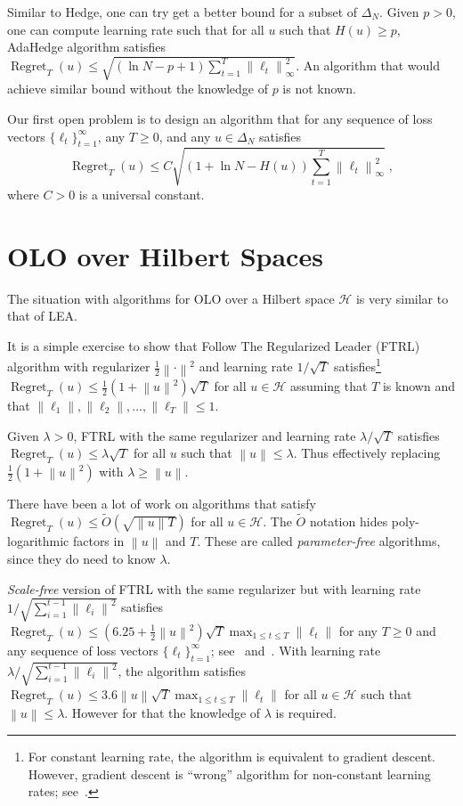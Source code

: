 \documentclass{colt2016} %
\DeclareMathOperator{\Regret}{Regret}
\renewcommand{\H}{\mathcal{H}}  %
\newcommand{\norm}[1]{\left\|{#1}\right\|}
\begin{document}
Similar to Hedge, one can try get a better bound for a subset of $\Delta_N$.
Given $p > 0$, one can compute learning rate such that for all $u$ such that
$H(u) \ge p$, AdaHedge algorithm satisfies $\Regret_T(u) \le \sqrt{(\ln N - p +
1) \sum_{t=1}^T \norm{\ell_t}_\infty^2}$. An algorithm that would achieve
similar bound without the knowledge of $p$ is not known.

Our first open problem is to design an algorithm that for any
sequence of loss vectors $\{\ell_t\}_{t=1}^\infty$, any $T \ge 0$,
and any $u \in \Delta_N$ satisfies
$$
\Regret_T(u) \le C \sqrt{(1 + \ln N - H(u)) \sum_{t=1}^T \norm{\ell_t}_\infty^2} \; ,
$$
where $C > 0$ is a universal constant.

\section{OLO over Hilbert Spaces}

The situation with algorithms for OLO over a Hilbert space $\H$ is very similar
to that of LEA.

It is a simple exercise to show that Follow The Regularized Leader (FTRL)
algorithm with regularizer $\frac{1}{2}\norm{\cdot}^2$ and learning rate
$1/\sqrt{T}$ satisfies\footnote{For constant learning rate, the algorithm is
equivalent to gradient descent. However, gradient descent is ``wrong'' algorithm
for non-constant learning rates; see~\cite{Orabona-Pal-2016-scale-free}.}
$\Regret_T(u) \le \frac{1}{2}(1 + \norm{u}^2) \sqrt{T}$ for all $u \in \H$
assuming that $T$ is known and that $\norm{\ell_1}, \norm{\ell_2}, \dots,
\norm{\ell_T} \le 1$.

Given $\lambda > 0$, FTRL with the same regularizer and
learning rate $\lambda/\sqrt{T}$ satisfies $\Regret_T(u) \le \lambda \sqrt{T}$
for all $u$ such that $\norm{u} \le \lambda$. Thus effectively replacing
$\frac{1}{2}(1 + \norm{u}^2)$ with $\lambda \ge \norm{u}$.

There have been a lot of work \citep{Streeter-McMahan-2012, Orabona-2013,
McMahan-Abernethy-2013, McMahan-Orabona-2014} on algorithms that satisfy
$\Regret_T(u) \le \widetilde O(\sqrt{\norm{u} T})$ for all $u \in \H$.
The $\widetilde O$ notation hides poly-logarithmic factors in $\norm{u}$ and
$T$. These are called \emph{parameter-free} algorithms, since they do need to
know $\lambda$.

\emph{Scale-free} version of FTRL with the same regularizer but with learning
rate $1/\sqrt{\sum_{i=1}^{t-1} \norm{\ell_i}^2}$ satisfies $\Regret_T(u) \le
(6.25 + \frac{1}{2}\norm{u}^2) \sqrt{T} \max_{1 \le t \le T} \norm{\ell_t}$ for
any $T \ge 0$ and any sequence of loss vectors $\{\ell_t\}_{t=1}^\infty$;
see~\cite{Orabona-Pal-2015} and~\cite{Duchi-Hazan-Singer-2011}. With learning
rate $\lambda/\sqrt{\sum_{i=1}^{t-1} \norm{\ell_i}^2}$, the algorithm satisfies
$\Regret_T(u) \le 3.6 \norm{u} \sqrt{T} \max_{1 \le t \le T} \norm{\ell_t}$ for
all $u \in \H$ such that $\norm{u} \le \lambda$. However for that the knowledge
of $\lambda$ is required.
\end{document}
